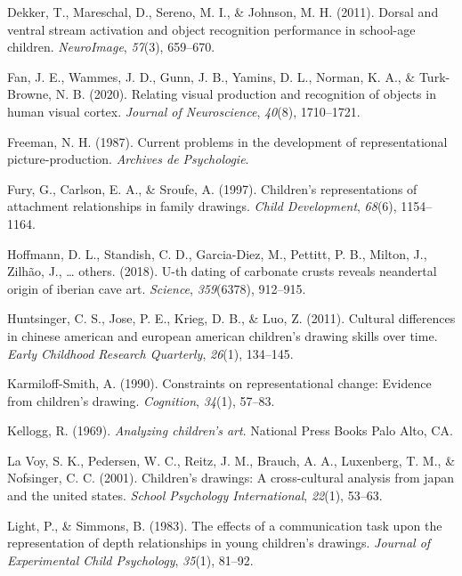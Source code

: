 \documentclass[
  english,
  man]{apa6}
\begin{document}
\leavevmode\hypertarget{ref-dekker2011dorsal}{}%
Dekker, T., Mareschal, D., Sereno, M. I., \& Johnson, M. H. (2011). Dorsal and ventral stream activation and object recognition performance in school-age children. \emph{NeuroImage}, \emph{57}(3), 659--670.

\leavevmode\hypertarget{ref-fan2020relating}{}%
Fan, J. E., Wammes, J. D., Gunn, J. B., Yamins, D. L., Norman, K. A., \& Turk-Browne, N. B. (2020). Relating visual production and recognition of objects in human visual cortex. \emph{Journal of Neuroscience}, \emph{40}(8), 1710--1721.

\leavevmode\hypertarget{ref-freeman1987current}{}%
Freeman, N. H. (1987). Current problems in the development of representational picture-production. \emph{Archives de Psychologie}.

\leavevmode\hypertarget{ref-fury1997children}{}%
Fury, G., Carlson, E. A., \& Sroufe, A. (1997). Children's representations of attachment relationships in family drawings. \emph{Child Development}, \emph{68}(6), 1154--1164.

\leavevmode\hypertarget{ref-hoffmann2018u}{}%
Hoffmann, D. L., Standish, C. D., Garcia-Diez, M., Pettitt, P. B., Milton, J., Zilhão, J., \ldots{} others. (2018). U-th dating of carbonate crusts reveals neandertal origin of iberian cave art. \emph{Science}, \emph{359}(6378), 912--915.

\leavevmode\hypertarget{ref-huntsinger2011cultural}{}%
Huntsinger, C. S., Jose, P. E., Krieg, D. B., \& Luo, Z. (2011). Cultural differences in chinese american and european american children's drawing skills over time. \emph{Early Childhood Research Quarterly}, \emph{26}(1), 134--145.

\leavevmode\hypertarget{ref-karmiloff1990constraints}{}%
Karmiloff-Smith, A. (1990). Constraints on representational change: Evidence from children's drawing. \emph{Cognition}, \emph{34}(1), 57--83.

\leavevmode\hypertarget{ref-kellogg1969analyzing}{}%
Kellogg, R. (1969). \emph{Analyzing children's art}. National Press Books Palo Alto, CA.

\leavevmode\hypertarget{ref-la2001children}{}%
La Voy, S. K., Pedersen, W. C., Reitz, J. M., Brauch, A. A., Luxenberg, T. M., \& Nofsinger, C. C. (2001). Children's drawings: A cross-cultural analysis from japan and the united states. \emph{School Psychology International}, \emph{22}(1), 53--63.

\leavevmode\hypertarget{ref-light1983effects}{}%
Light, P., \& Simmons, B. (1983). The effects of a communication task upon the representation of depth relationships in young children's drawings. \emph{Journal of Experimental Child Psychology}, \emph{35}(1), 81--92.
\end{document}

